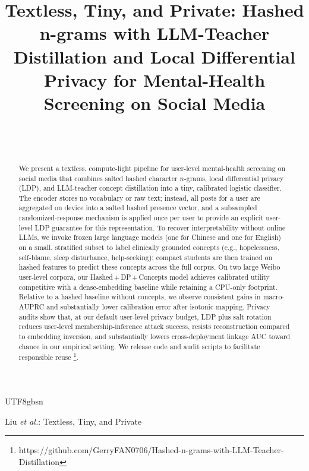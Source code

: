 \documentclass[lettersize,journal]{IEEEtran}
\begin{document}
\begin{CJK*}{UTF8}{gbsn}
\title{Textless, Tiny, and Private: Hashed n\mbox{-}grams with LLM\mbox{-}Teacher Distillation and Local Differential Privacy for Mental\mbox{-}Health Screening on Social Media}
\author{
\\
\\
}
%
{Liu \MakeLowercase{\textit{et al.}}: Textless, Tiny, and Private}


\maketitle


\begin{abstract}
We present a textless, compute-light pipeline for user-level mental-health screening on social media that combines salted hashed character $n$-grams, local differential privacy (LDP), and LLM-teacher concept distillation into a tiny, calibrated logistic classifier. The encoder stores no vocabulary or raw text; instead, all posts for a user are aggregated on device into a salted hashed presence vector, and a subsampled randomized-response mechanism is applied once per user to provide an explicit user-level LDP guarantee for this representation. To recover interpretability without online LLMs, we invoke frozen large language models (one for Chinese and one for English) on a small, stratified subset to label clinically grounded concepts (e.g., hopelessness, self-blame, sleep disturbance, help-seeking); compact students are then trained on hashed features to predict these concepts across the full corpus. On two large Weibo user-level corpora, our Hashed\,+\,DP\,+\,Concepts model achieves calibrated utility competitive with a dense-embedding baseline while retaining a CPU-only footprint. Relative to a hashed baseline without concepts, we observe consistent gains in macro-AUPRC and substantially lower calibration error after isotonic mapping. Privacy audits show that, at our default user-level privacy budget, LDP plus salt rotation reduces user-level membership-inference attack success, resists reconstruction compared to embedding inversion, and substantially lowers cross-deployment linkage AUC toward chance in our empirical setting. We release code and audit scripts to facilitate responsible reuse \footnote{https://github.com/GerryFAN0706/Hashed-n-grams-with-LLM-Teacher-Distillation}. 
\end{abstract}




\end{CJK*}
\end{document}

